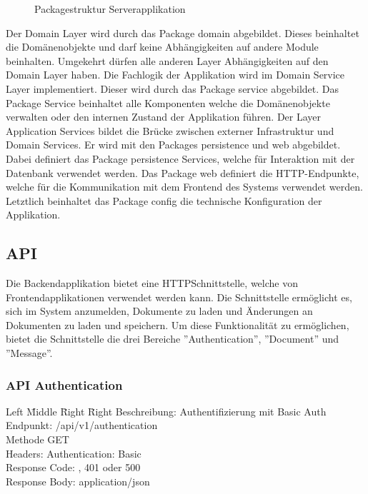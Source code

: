 \begin{figure}[h]
    \centering
    \begin{minipage}[b]{0.9\textwidth}
        \caption{Packagestruktur Serverapplikation}\label{fig:packagesserver}
    \end{minipage}
\end{figure}

Der Domain Layer wird durch das Package domain abgebildet.
Dieses beinhaltet die Domänenobjekte und darf keine Abhängigkeiten auf andere Module beinhalten.
Umgekehrt dürfen alle anderen Layer Abhängigkeiten auf den Domain Layer haben.
Die Fachlogik der Applikation wird im Domain Service Layer implementiert.
Dieser wird durch das Package service abgebildet.
Das Package Service beinhaltet alle Komponenten welche die Domänenobjekte verwalten oder den internen Zustand der Applikation führen.
Der Layer Application Services bildet die Brücke zwischen externer Infrastruktur und Domain Services.
Er wird mit den Packages persistence und web abgebildet.
Dabei definiert das Package persistence Services, welche für Interaktion mit der Datenbank verwendet werden.
Das Package web definiert die HTTP-Endpunkte, welche für die Kommunikation mit dem Frontend des Systems verwendet werden.
Letztlich beinhaltet das Package config die technische Konfiguration der Applikation.

\clearpage

\subsection{API}\label{subsec:api}

Die Backendapplikation bietet eine HTTP\-Schnittstelle, welche von Frontendapplikationen verwendet werden kann.
Die Schnittstelle ermöglicht es, sich im System anzumelden, Dokumente zu laden und Änderungen an Dokumenten zu laden und speichern.
Um diese Funktionalität zu ermöglichen, bietet die Schnittstelle die drei Bereiche ''Authentication'', ''Document'' und ''Message''.

\subsubsection{API Authentication}

\begin{tabbing}
Left \= Middle \= Right \= Right \kill
Beschreibung:  \> \> \> Authentifizierung mit Basic Auth\\
Endpunkt:  \> \> \> /api/v1/authentication\\
Methode \>  \> \> GET\\
Headers:  \> \>   \> Authentication: Basic \\
Response Code:  \> \>  , 401 oder 500 \\
Response Body:  \> \>  \> application/json \\
\end{tabbing}

